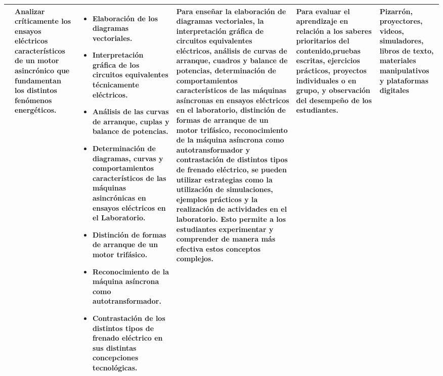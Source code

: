 \documentclass[a4paper,12pt]{article}
\newcommand{\evaluacion}{Para evaluar el aprendizaje en relación a los saberes prioritarios del contenido,pruebas escritas, ejercicios prácticos, proyectos individuales o en
grupo, y observación del desempeño de los estudiantes.}
\newcommand{\recursos}{Pizarrón, proyectores, videos, simuladores, libros de texto, materiales manipulativos y plataformas digitales}
\begin{document}
\begin{longtable}[h!]{|p{1cm}|p{3cm}|p{8cm}|p{6cm}|p{3.5cm}|p{3cm}|}
& Analizar críticamente los
ensayos eléctricos
característicos de un motor
asincrónico que
fundamentan los distintos
fenómenos energéticos.& \begin{itemize}
    \item Elaboración de los diagramas vectoriales.
\item Interpretación gráfica de los circuitos equivalentes
técnicamente eléctricos.
\item Análisis de las curvas de arranque, cuplas y balance de
potencias.
\item Determinación de diagramas, curvas y comportamientos
característicos de las máquinas asincrónicas en ensayos
eléctricos en el Laboratorio.
\item Distinción de formas de arranque de un motor trifásico.
\item Reconocimiento de la máquina asíncrona como
autotransformador.
\item Contrastación de los distintos tipos de frenado eléctrico
en sus distintas concepciones tecnológicas. 

\end{itemize}& Para enseñar la elaboración de diagramas vectoriales, la interpretación gráfica de circuitos equivalentes eléctricos, análisis de curvas de arranque, cuadros y balance de potencias, determinación de comportamientos característicos de las máquinas asíncronas en ensayos eléctricos en el laboratorio, distinción de formas de arranque de un motor trifásico, reconocimiento de la máquina asíncrona como autotransformador y contrastación de distintos tipos de frenado eléctrico, se pueden utilizar estrategias como la utilización de simulaciones, ejemplos prácticos y la realización de actividades en el laboratorio. Esto permite a los estudiantes experimentar y comprender de manera más efectiva estos conceptos complejos. & \evaluacion & \recursos \\ \hline



\end{longtable}
\end{document}
